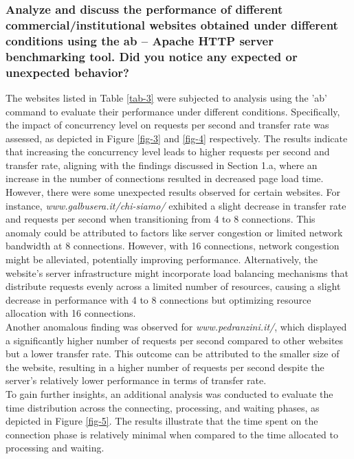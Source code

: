 \documentclass[eng]{class}
\begin{document}
\subsubsection*{Analyze and discuss the performance of different commercial/institutional websites obtained
	under different conditions using the ab – Apache HTTP server benchmarking tool. Did you
	notice any expected or unexpected behavior?}
The websites listed in Table \ref{tab-3} were subjected to analysis using the 'ab' command to evaluate their performance under different conditions.
Specifically, the impact of concurrency level on requests per second and transfer rate was assessed, as depicted in Figure \ref*{fig-3} and \ref*{fig-4} respectively.
The results indicate that increasing the concurrency level leads to higher requests per second and transfer rate,
aligning with the findings discussed in Section 1.a, where an increase in the number of connections resulted in decreased page load time.\\
However, there were some unexpected results observed for certain websites. For instance, \textit{www.galbusera.it/chi-siamo/}
exhibited a slight decrease in transfer rate and requests per second when transitioning from 4 to 8 connections.
This anomaly could be attributed to factors like server congestion or limited network bandwidth at 8 connections.
However, with 16 connections, network congestion might be alleviated, potentially improving performance.
Alternatively, the website's server infrastructure might incorporate load balancing mechanisms that distribute requests evenly across
a limited number of resources, causing a slight decrease in performance with 4 to 8 connections but optimizing resource allocation with 16 connections.\\
Another anomalous finding was observed for \textit{www.pedranzini.it/}, which displayed a significantly higher number of
requests per second compared to other websites but a lower transfer rate. This outcome can be attributed to the smaller size of the website,
resulting in a higher number of requests per second despite the server's relatively lower performance in terms of transfer rate.\\
\noindent
To gain further insights, an additional analysis was conducted to evaluate the time distribution across the connecting, processing, and waiting phases,
as depicted in Figure \ref*{fig-5}.
The results illustrate that the time spent on the connection phase is relatively minimal when compared to the time allocated to processing and waiting.\\
\end{document}
